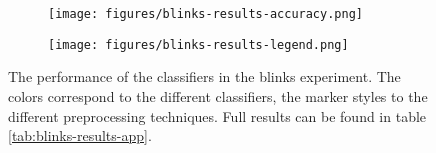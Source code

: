 \begin{figure}
    \centering
    \begin{subfigure}{0.5\linewidth}
        \centering
        \captionsetup{width = 0.9\linewidth}
        \texttt{[image: figures/blinks-results-accuracy.png]}
    \end{subfigure}%
    \begin{subfigure}{0.5\linewidth}
        \centering
        \captionsetup{width = 0.9\linewidth}
        \texttt{[image: figures/blinks-results-legend.png]}
    \end{subfigure}%
    \caption{The performance of the classifiers in the blinks experiment. The colors correspond to the different classifiers, the marker styles to the different preprocessing techniques. Full results can be found in table \ref{tab:blinks-results-app}.}
    \label{fig:blinks-results}
\end{figure}